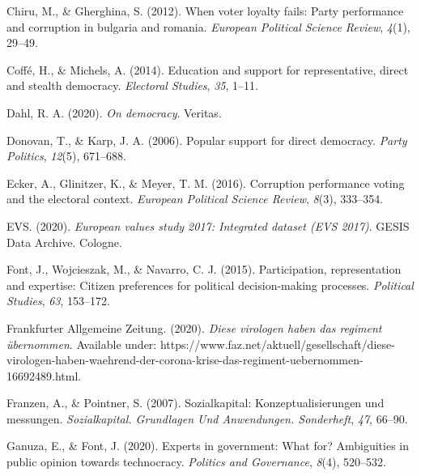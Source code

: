 \documentclass[
  12pt,
  english,
]{article}
\newlength{\cslhangindent}
\newlength{\cslentryspacingunit} %
\newenvironment{CSLReferences}[2] %
 {%
  \setlength{\parindent}{0pt}
  \ifodd #1
  \let\oldpar\par
  \def\par{\hangindent=\cslhangindent\oldpar}
  \fi
  \setlength{\parskip}{#2\cslentryspacingunit}
 }%
 {}
\begin{document}
\begin{CSLReferences}{1}{0}
\leavevmode{}%
Chiru, M., \& Gherghina, S. (2012). When voter loyalty fails: Party
performance and corruption in bulgaria and romania. \emph{European
Political Science Review}, \emph{4}(1), 29--49.

\leavevmode{}%
Coffé, H., \& Michels, A. (2014). Education and support for
representative, direct and stealth democracy. \emph{Electoral Studies},
\emph{35}, 1--11.

\leavevmode{}%
Dahl, R. A. (2020). \emph{On democracy}. Veritas.

\leavevmode{}%
Donovan, T., \& Karp, J. A. (2006). Popular support for direct
democracy. \emph{Party Politics}, \emph{12}(5), 671--688.

\leavevmode{}%
Ecker, A., Glinitzer, K., \& Meyer, T. M. (2016). Corruption performance
voting and the electoral context. \emph{European Political Science
Review}, \emph{8}(3), 333--354.

\leavevmode{}%
EVS. (2020). \emph{European values study 2017: Integrated dataset (EVS
2017)}. GESIS Data Archive. Cologne.

\leavevmode{}%
Font, J., Wojcieszak, M., \& Navarro, C. J. (2015). Participation,
representation and expertise: Citizen preferences for political
decision-making processes. \emph{Political Studies}, \emph{63},
153--172.

\leavevmode{}%
Frankfurter Allgemeine Zeitung. (2020). \emph{Diese virologen haben das
regiment übernommen}. Available under:
https://www.faz.net/aktuell/gesellschaft/diese-virologen-haben-waehrend-der-corona-krise-das-regiment-uebernommen-16692489.html.

\leavevmode{}%
Franzen, A., \& Pointner, S. (2007). Sozialkapital: Konzeptualisierungen
und messungen. \emph{Sozialkapital. Grundlagen Und Anwendungen.
Sonderheft}, \emph{47}, 66--90.

\leavevmode{}%
Ganuza, E., \& Font, J. (2020). Experts in government: What for?
Ambiguities in public opinion towards technocracy. \emph{Politics and
Governance}, \emph{8}(4), 520--532.


\end{CSLReferences}
\end{document}
